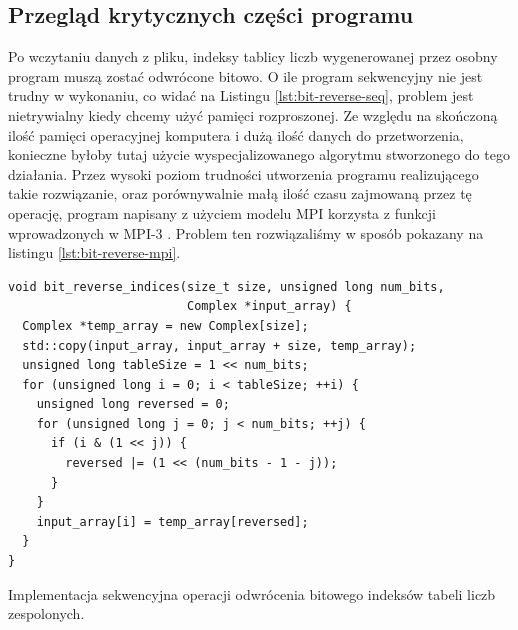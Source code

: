 \documentclass[a4paper,12pt]{book} %
\begin{document}
\subsection{Przegląd krytycznych części programu}
Po wczytaniu danych z pliku, indeksy tablicy liczb wygenerowanej przez osobny program muszą zostać odwrócone bitowo. O ile program sekwencyjny nie jest trudny w wykonaniu, co widać na Listingu \ref{lst:bit-reverse-seq}, problem jest nietrywialny kiedy chcemy użyć pamięci rozproszonej. Ze względu na skończoną ilość pamięci operacyjnej komputera i dużą ilość danych do przetworzenia, konieczne byłoby tutaj użycie wyspecjalizowanego algorytmu stworzonego do tego działania. Przez wysoki poziom trudności utworzenia programu realizującego takie rozwiązanie, oraz porównywalnie małą ilość czasu zajmowaną przez tę operację, program napisany z użyciem modelu MPI korzysta z funkcji wprowadzonych w MPI-3 \cite{mpi41}. Problem ten rozwiązaliśmy w sposób pokazany na listingu \ref{lst:bit-reverse-mpi}.

\begin{lstfloat}
\lstset{language=C++}
\begin{lstlisting}[frame=single]
void bit_reverse_indices(size_t size, unsigned long num_bits,
                         Complex *input_array) {
  Complex *temp_array = new Complex[size];
  std::copy(input_array, input_array + size, temp_array);
  unsigned long tableSize = 1 << num_bits;
  for (unsigned long i = 0; i < tableSize; ++i) {
    unsigned long reversed = 0;
    for (unsigned long j = 0; j < num_bits; ++j) {
      if (i & (1 << j)) {
        reversed |= (1 << (num_bits - 1 - j));
      }
    }
    input_array[i] = temp_array[reversed];
  }
}
\end{lstlisting}
\caption{Implementacja sekwencyjna operacji odwrócenia bitowego indeksów tabeli liczb zespolonych.}
\label{lst:bit-reverse-seq}
\end{lstfloat}
\end{document}
